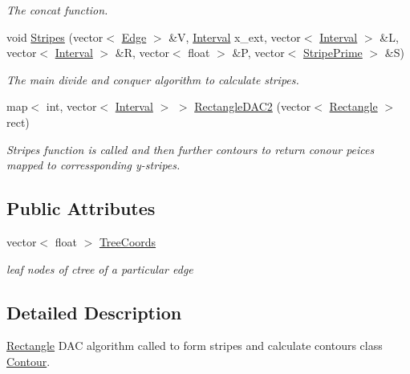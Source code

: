 \begin{DoxyCompactItemize}
\begin{DoxyCompactList}\small\item\em The concat function. \end{DoxyCompactList}\item 
void \hyperlink{classContour_a604abcf672cfc7af1d3a3b8a03c836f4}{Stripes} (vector$<$ \hyperlink{classEdge}{Edge} $>$ \&V, \hyperlink{classInterval}{Interval} x\+\_\+ext, vector$<$ \hyperlink{classInterval}{Interval} $>$ \&L, vector$<$ \hyperlink{classInterval}{Interval} $>$ \&R, vector$<$ float $>$ \&P, vector$<$ \hyperlink{classStripePrime}{Stripe\+Prime} $>$ \&S)
\begin{DoxyCompactList}\small\item\em The main divide and conquer algorithm to calculate stripes. \end{DoxyCompactList}\item 
map$<$ int, vector$<$ \hyperlink{classInterval}{Interval} $>$ $>$ \hyperlink{classContour_a12d302a8ebc036b8f85e75b3f19e85df}{Rectangle\+D\+A\+C2} (vector$<$ \hyperlink{classRectangle}{Rectangle} $>$ rect)
\begin{DoxyCompactList}\small\item\em Stripes function is called and then further contours to return conour peices mapped to corressponding y-\/stripes. \end{DoxyCompactList}\end{DoxyCompactItemize}
\subsection*{Public Attributes}
\begin{DoxyCompactItemize}
\item 
\mbox{\label{classContour_adbbd4833112e8ae53b313308c984e8cc}} 
vector$<$ float $>$ \hyperlink{classContour_adbbd4833112e8ae53b313308c984e8cc}{Tree\+Coords}
\begin{DoxyCompactList}\small\item\em leaf nodes of ctree of a particular edge \end{DoxyCompactList}\end{DoxyCompactItemize}


\subsection{Detailed Description}
\hyperlink{classRectangle}{Rectangle} D\+AC algorithm called to form stripes and calculate contours class \hyperlink{classContour}{Contour}. 

